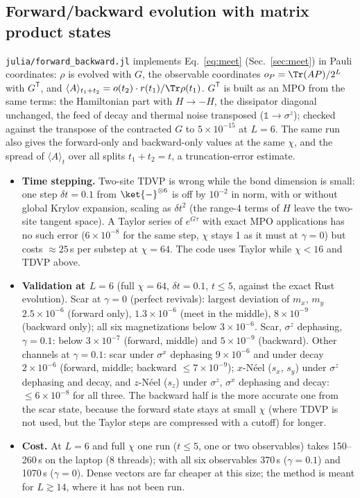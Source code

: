 \subsection{Forward/backward evolution with matrix product states}
\label{sec:fb}

\texttt{julia/forward\_backward.jl} implements Eq.~\eqref{eq:meet} (Sec.~\ref{sec:meet}) in Pauli coordinates: $\rho$ is evolved with $G$, the observable coordinates $o_P = \Tr(AP)/2^L$ with $G^{\mathsf T}$, and $\langle A\rangle_{t_1+t_2} = o(t_2)\cdot r(t_1)/\Tr\rho(t_1)$. $G^{\mathsf T}$ is built as an MPO from the same terms: the Hamiltonian part with $H \to -H$, the dissipator diagonal unchanged, the feed of decay and thermal noise transposed ($\mathds 1 \to \sigma^z$); checked against the transpose of the contracted $G$ to $5\times10^{-15}$ at $L = 6$. The same run also gives the forward-only and backward-only values at the same $\chi$, and the spread of $\langle A\rangle_t$ over all splits $t_1 + t_2 = t$, a truncation-error estimate.

\begin{itemize}
\item \textbf{Time stepping.} Two-site TDVP is wrong while the bond dimension is small: one step $\delta t = 0.1$ from $\ket{-}^{\otimes 6}$ is off by $10^{-2}$ in norm, with or without global Krylov expansion, scaling as $\delta t^2$ (the range-4 terms of $H$ leave the two-site tangent space). A Taylor series of $e^{G\tau}$ with exact MPO applications has no such error ($6\times10^{-8}$ for the same step, $\chi$ stays 1 as it must at $\gamma = 0$) but costs $\approx 25$\,s per substep at $\chi = 64$. The code uses Taylor while $\chi < 16$ and TDVP above.
\item \textbf{Validation at $L = 6$} (full $\chi = 64$, $\delta t = 0.1$, $t \le 5$, against the exact Rust evolution). Scar at $\gamma = 0$ (perfect revivals): largest deviation of $m_x$, $m_y$ $2.5\times10^{-6}$ (forward only), $1.3\times10^{-6}$ (meet in the middle), $8\times10^{-9}$ (backward only); all six magnetizations below $3\times10^{-6}$. Scar, $\sigma^z$ dephasing, $\gamma = 0.1$: below $3\times10^{-7}$ (forward, middle) and $5\times10^{-9}$ (backward). Other channels at $\gamma = 0.1$: scar under $\sigma^x$ dephasing $9\times10^{-6}$ and under decay $2\times10^{-6}$ (forward, middle; backward $\le 7\times10^{-9}$); $x$-N\'eel ($s_x$, $s_y$) under $\sigma^z$ dephasing and decay, and $z$-N\'eel ($s_z$) under $\sigma^z$, $\sigma^x$ dephasing and decay: $\le 6\times10^{-8}$ for all three. The backward half is the more accurate one from the scar state, because the forward state stays at small $\chi$ (where TDVP is not used, but the Taylor steps are compressed with a cutoff) for longer.
\item \textbf{Cost.} At $L = 6$ and full $\chi$ one run ($t \le 5$, one or two observables) takes 150--260\,s on the laptop (8 threads); with all six observables 370\,s ($\gamma = 0.1$) and 1070\,s ($\gamma = 0$). Dense vectors are far cheaper at this size; the method is meant for $L \gtrsim 14$, where it has not been run.
\end{itemize}

